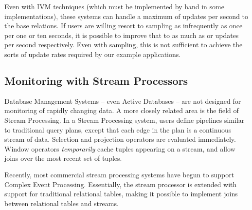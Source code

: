 Even with IVM techniques (which must be implemented by hand in some implementations), these systems can handle a maximum of  updates per second to the base relations.  If users are willing resort to sampling as infrequently as once per one or ten seconds, it is possible to improve that to as much as  or  updates per second respectively.  Even with sampling, this is not sufficient to achieve the sorts of update rates required by our example applications.

\subsection{Monitoring with Stream Processors}
Database Management Systems -- even Active Databases -- are not designed for monitoring of rapidly changing data.  A more closely related area is the field of Stream Processing\cite{?}.  In a Stream Processing system, users define pipelines similar to traditional query plans, except that each edge in the plan is a continuous stream of data.  Selection and projection operators are evaluated immediately.  Window operators\cite{?} {\em temporarily} cache tuples appearing on a stream, and allow joins over the most recent set of tuples.

Recently, most commercial stream processing systems have begun to support Complex Event Processing\cite{?}.  Essentially, the stream processor is extended with support for traditional relational tables, making it possible to implement joins between relational tables and streams.  


